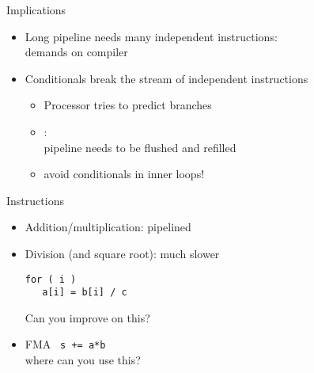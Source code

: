 \begin{numberedframe}{Implications}
  \begin{itemize}
  \item Long pipeline needs many independent instructions:\\
    demands on compiler
  \item Conditionals break the stream of independent instructions
    \begin{itemize}
    \item Processor tries to predict branches
    \item {}:\\
      pipeline needs to be flushed and refilled
    \item avoid conditionals in inner loops!
    \end{itemize}
  \end{itemize}
\end{numberedframe}

\begin{numberedframe}{Instructions}
  \begin{itemize}
  \item Addition/multiplication: pipelined
  \item Division (and square root): much slower
\begin{lstlisting}
for ( i )
   a[i] = b[i] / c
\end{lstlisting}
Can you improve on this?
\item \acf{FMA} \lstinline{ s += a*b}\\
  where can you use this?
  \end{itemize}
\end{numberedframe}

